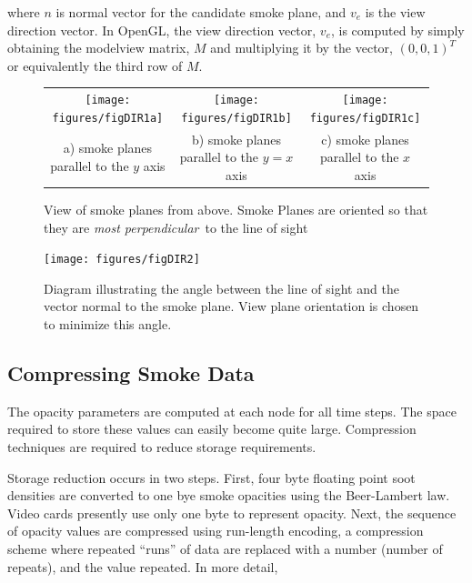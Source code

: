 \noindent where $n$ is normal vector for the candidate smoke plane, and $v_e$ is the view direction vector.  In OpenGL, the view direction vector, $v_e$, is computed by simply obtaining the modelview matrix, $M$ and multiplying it by the vector, $(0,0,1)^T$ or equivalently the third row of $M$.

\begin{figure}
\begin{tabular}{ccc}
\texttt{[image: figures/figDIR1a]}&
\texttt{[image: figures/figDIR1b]}&
\texttt{[image: figures/figDIR1c]}\\
a) smoke planes parallel to the $y$ axis& b) smoke planes parallel to
the $y=x$ axis&
c) smoke planes parallel to the $x$ axis\\
\end{tabular}
\caption{View of smoke planes from above.  Smoke Planes are
oriented so that they are {\em most perpendicular}\ to the line of sight }
\label{figDIRA}
\end{figure}

\begin{figure}
\centerline{\texttt{[image: figures/figDIR2]}}
\caption[Diagram illustrating the angle between the line of sight
and the vector normal to the smoke plane.]{Diagram illustrating the angle between the line of sight
and the vector normal to the smoke plane.  View plane orientation is chosen to minimize
this angle.} \label{figDIRB}
\end{figure}

%
%

\subsection{Compressing Smoke Data}

The opacity parameters are computed at each node for all time steps. The space required to store these values can easily become quite large. Compression techniques are required to reduce storage requirements.

Storage reduction occurs in two steps.  First, four byte floating point soot densities are converted to one bye smoke opacities using the Beer-Lambert law.  Video cards presently use only one byte to represent opacity. Next, the sequence of opacity values are compressed using run-length encoding, a compression scheme where repeated ``runs'' of data are replaced with a number (number of repeats), and the value repeated.  In more detail,


